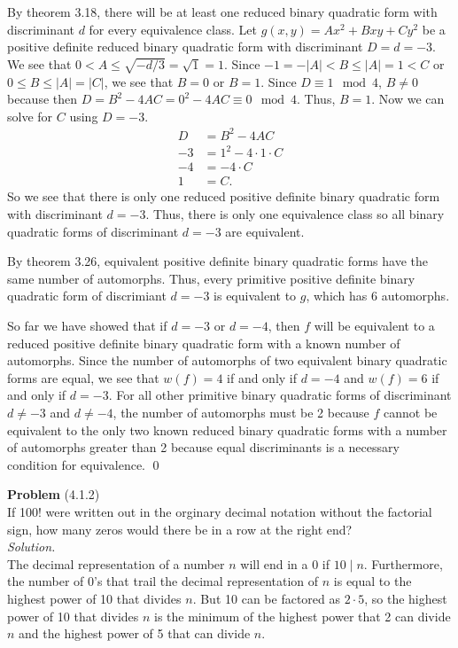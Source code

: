 \documentclass[12 pt]{amsart}
\begin{document}
\begin{enumerate}
      By theorem 3.18, there will be at least one reduced 
      binary quadratic form with discriminant $d$
      for every equivalence class.
      Let $g(x,y) = Ax^2 + Bxy + Cy^2$ be a positive definite reduced binary 
      quadratic form with discriminant $D = d = -3$.
      We see that $0 < A \leq \sqrt{-d/3} = \sqrt{1} = 1$.
      Since $-1 = -|A| < B \leq |A| = 1 < C$ or 
      $0 \leq B \leq |A| = |C|$, we see that $B = 0$ or $B = 1$.
      Since $D \equiv 1 \mod 4$, $B \neq 0$ because then
      $D = B^2 - 4AC = 0^2 - 4AC \equiv 0 \mod 4$.
      Thus, $B = 1$.
      Now we can solve for $C$ using $D = -3$.
      \begin{align*}
        D &= B^2 - 4AC \\
        -3 &= 1^2 - 4 \cdot 1 \cdot C \\
        -4 &= -4 \cdot C \\
        1 &= C.
      \end{align*}
      So we see that there is only one reduced positive definite binary
      quadratic form with discriminant $d = -3$. 
      Thus, there is only one equivalence class so all 
      binary quadratic forms of discriminant $d = -3$ are
      equivalent.

      By theorem 3.26, equivalent positive definite binary quadratic
      forms have the same number of automorphs.
      Thus, every primitive positive definite binary quadratic form
      of discrimiant $d = -3$
      is equivalent to $g$, which has 6 automorphs.
  \end{enumerate}
  So far we have showed that if $d = -3$ or $d = -4$, then $f$ will
  be equivalent to a reduced positive definite binary quadratic form
  with a known number of automorphs. 
  Since the number of automorphs of two equivalent binary quadratic
  forms are equal, we see that $w(f) = 4$ if and only if $d = -4$ and 
  $w(f) = 6$ if and only if $d = -3$.
  For all other primitive binary quadratic forms of discriminant
  $d \neq -3$ and $d \neq -4$, the number of automorphs must be 2
  because $f$ cannot be equivalent to the only two known reduced
  binary quadratic forms with a number of automorphs greater than 2
  because equal discriminants is a necessary condition for 
  equivalence.
  \qed
\vfill
\newpage



\phantom{\quad} \vfill
\noindent
\textbf{Problem} (4.1.2) \\[4ex]
  If 100! were written out in the orginary decimal notation without the
  factorial sign, how many zeros would there be in a row at the right end?
  \\[2ex]
\emph{Solution.} \\[2ex]
  The decimal representation of a number $n$ will end in a 0 if 
  $10 \mid n$.
  Furthermore, the number of 0's that trail the decimal representation
  of $n$ is equal to the highest power of 10 that divides $n$.
  But 10 can be factored as $2 \cdot 5$, so the highest power of 
  10 that divides $n$ is the minimum of the highest power that
  2 can divide $n$ and the highest power of 5 that can divide $n$.
\end{document}
